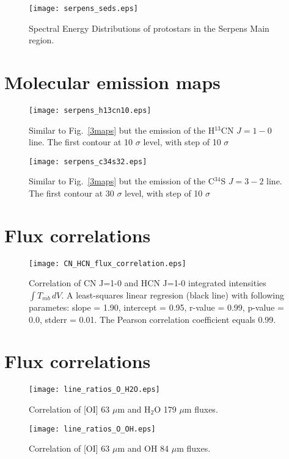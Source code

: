 \documentclass{aa}
\begin{document}
\begin{appendix}
\begin{figure}
   \texttt{[image: serpens\_seds.eps]}
      \caption{Spectral Energy Distributions of protostars in the Serpens Main region.}
         \label{seds}
   \end{figure}

\section{Molecular emission maps}

\begin{figure}
\texttt{[image: serpens\_h13cn10.eps]}
\caption{Similar to Fig.~\ref{3maps} but the emission of the H$^{13}$CN $J=1-0$ line. The first contour at 10 $\sigma$ level, with step of 10 $\sigma$}
\label{h13cn10}
\end{figure}


\begin{figure}
\texttt{[image: serpens\_c34s32.eps]}
\caption{Similar to Fig.~\ref{3maps} but the emission of the C$^{34}$S $J=3-2$ line. The first contour at 30 $\sigma$ level, with step of 10 $\sigma$}
\label{c34s32}
\end{figure}


\section{Flux correlations}

\begin{figure}
\texttt{[image: CN\_HCN\_flux\_correlation.eps]}
\caption{Correlation of CN J=1-0 and HCN J=1-0 integrated intensities $\int{T_{mb} \, dV}$. A least-squares linear regresion (black line) with following parametes: slope = 1.90, intercept = 0.95, r-value = 0.99, p-value = 0.0, stderr = 0.01. The Pearson correlation coefficient equals 0.99. }
\label{h13cn10}
\end{figure}


\section{Flux correlations}

\begin{figure}
\texttt{[image: line\_ratios\_O\_H2O.eps]}
\caption{Correlation of [OI] 63 $\mu$m and H$_2$O 179 $\mu$m fluxes.}
\label{h13cn10}
\end{figure}

\begin{figure}
\texttt{[image: line\_ratios\_O\_OH.eps]}
\caption{Correlation of [OI] 63 $\mu$m and OH 84 $\mu$m fluxes.}
\label{h13cn10}
\end{figure}


\end{appendix}
\end{document}
